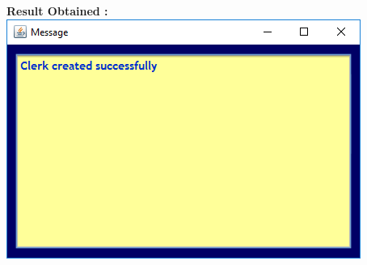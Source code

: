 \documentclass{article}
\begin{document}
\begin{enumerate}
\begin{itemize}
\textbf{Result Obtained :}
\includegraphics[scale=0.8]{images/LibrarianLogin/Actions/CreateClerk/ClerkCreated.PNG}\\



\end{itemize}
\end{enumerate}
\end{document}
